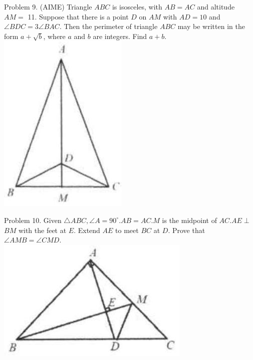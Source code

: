 \documentclass[10pt]{article}
\begin{document}
Problem 9. (AIME) Triangle \(A B C\) is isosceles, with \(A B=A C\) and altitude \(A M=\) 11. Suppose that there is a point \(D\) on \(A M\) with \(A D=10\) and \(\angle B D C=3 \angle B A C\). Then the perimeter of triangle \(A B C\) may be written in the form \(a+\sqrt{b}\), where \(a\) and \(b\) are integers. Find \(a+b\).\\
\includegraphics[max width=\textwidth, center]{2025_04_17_97bc1f7e44d93c271a88g-066}

Problem 10. Given \(\triangle A B C, \angle A=90^{\circ} . A B=A C . M\) is the midpoint of \(A C . A E \perp\) \(B M\) with the feet at \(E\). Extend \(A E\) to meet \(B C\) at \(D\). Prove that \(\angle A M B=\angle C M D\).\\
\includegraphics[max width=\textwidth, center]{2025_04_17_97bc1f7e44d93c271a88g-066(2)}
\end{document}
